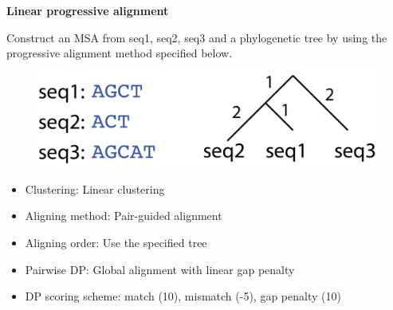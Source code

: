 \question \textbf{Linear progressive alignment}

Construct an MSA from seq1, seq2, seq3 and a phylogenetic tree by using the progressive alignment method specified below.

\begin{figure}[H]
      \centering
      \includegraphics[width=0.4 \textwidth]{fig10/progressive_alignment_tree.png}
\end{figure}

\begin{itemize}
\item Clustering: Linear clustering
\item Aligning method: Pair-guided alignment
\item Aligning order: Use the specified tree 
\item Pairwise DP: Global alignment with linear gap penalty
\item DP scoring scheme: match (10), mismatch (-5), gap penalty (10)
\end{itemize}

